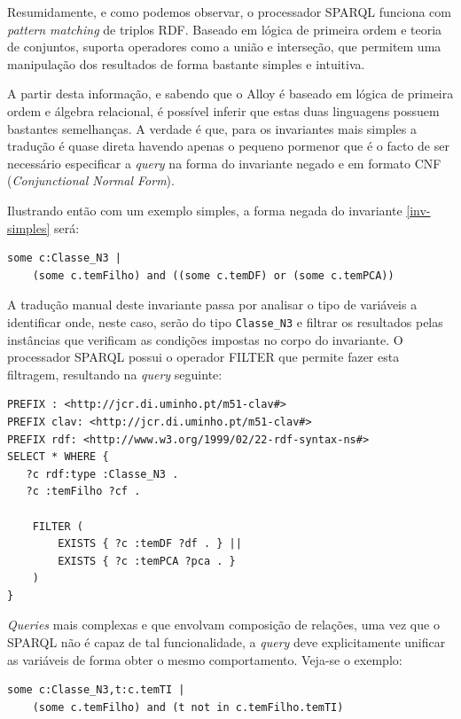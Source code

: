 \documentclass[tikz,runningheads,a4paper]{llncs}
\begin{document}
Resumidamente, e como podemos observar, o processador SPARQL funciona com
\textit{pattern matching} de triplos RDF. Baseado em lógica de primeira ordem e
teoria de conjuntos, suporta operadores como a união e interseção,
que permitem uma manipulação dos resultados de forma bastante simples e
intuitiva.

A partir desta informação, e sabendo que o Alloy é baseado em lógica de primeira
ordem e álgebra relacional, é possível inferir que estas duas linguagens possuem
bastantes semelhanças. A verdade é que, para os invariantes mais simples a
tradução é quase direta havendo apenas o pequeno pormenor que é o facto de ser necessário
especificar a \textit{query} na forma do invariante negado e em formato CNF
(\textit{Conjunctional Normal Form}).

Ilustrando então com um exemplo simples, a forma negada do invariante \ref{inv-simples} será:

\begin{lstlisting}[language=alloy, frame=single]
some c:Classe_N3 | 
    (some c.temFilho) and ((some c.temDF) or (some c.temPCA))
\end{lstlisting} 

A tradução manual deste invariante passa por analisar o tipo de variáveis a
identificar onde, neste caso, serão do tipo \texttt{Classe\_N3} e filtrar os
resultados pelas instâncias que verificam as condições impostas no corpo do
invariante. O processador SPARQL possui o operador FILTER que permite fazer esta
filtragem, resultando na \textit{query} seguinte:

\begin{lstlisting}[language=sparql, frame=single, basicstyle=\scriptsize]
PREFIX : <http://jcr.di.uminho.pt/m51-clav#>
PREFIX clav: <http://jcr.di.uminho.pt/m51-clav#>
PREFIX rdf: <http://www.w3.org/1999/02/22-rdf-syntax-ns#>
SELECT * WHERE {
   ?c rdf:type :Classe_N3 .
   ?c :temFilho ?cf .

    FILTER (
        EXISTS { ?c :temDF ?df . } ||
        EXISTS { ?c :temPCA ?pca . }
    )
}
\end{lstlisting} 

\textit{Queries} mais complexas e que envolvam composição de relações, uma vez
que o SPARQL não é capaz de tal funcionalidade, a \textit{query} deve
explicitamente unificar as variáveis de forma obter o mesmo comportamento.
Veja-se o exemplo:

\begin{lstlisting}[language=alloy, frame=single]
some c:Classe_N3,t:c.temTI | 
    (some c.temFilho) and (t not in c.temFilho.temTI)
\end{lstlisting} 
\end{document}
